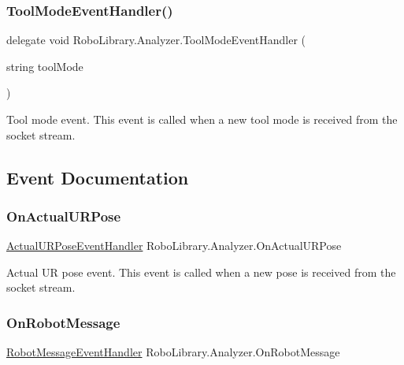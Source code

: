 \subsubsection{\texorpdfstring{Tool\+Mode\+Event\+Handler()}{ToolModeEventHandler()}}
{\footnotesize\ttfamily delegate void Robo\+Library.\+Analyzer.\+Tool\+Mode\+Event\+Handler (\begin{DoxyParamCaption}\item[{string}]{tool\+Mode }\end{DoxyParamCaption})}



Tool mode event. This event is called when a new tool mode is received from the socket stream.



\subsection{Event Documentation}
\hypertarget{class_robo_library_1_1_analyzer_a5295d61bea6f0f95d4d7cf6a121efaec}{}\label{class_robo_library_1_1_analyzer_a5295d61bea6f0f95d4d7cf6a121efaec} 
\subsubsection{\texorpdfstring{On\+Actual\+U\+R\+Pose}{OnActualURPose}}
{\footnotesize\ttfamily \hyperlink{class_robo_library_1_1_analyzer_a232f56c61a30de1de9e27021bf5dc77b}{Actual\+U\+R\+Pose\+Event\+Handler} Robo\+Library.\+Analyzer.\+On\+Actual\+U\+R\+Pose\hspace{0.3cm}{\ttfamily [static]}}



Actual UR pose event. This event is called when a new pose is received from the socket stream.

\hypertarget{class_robo_library_1_1_analyzer_ad2f4496aa598c9e9a8380c484aacdb5d}{}\label{class_robo_library_1_1_analyzer_ad2f4496aa598c9e9a8380c484aacdb5d} 
\subsubsection{\texorpdfstring{On\+Robot\+Message}{OnRobotMessage}}
{\footnotesize\ttfamily \hyperlink{class_robo_library_1_1_analyzer_a985396dd045b907a73d7b627b9bd07dc}{Robot\+Message\+Event\+Handler} Robo\+Library.\+Analyzer.\+On\+Robot\+Message\hspace{0.3cm}{\ttfamily [static]}}



